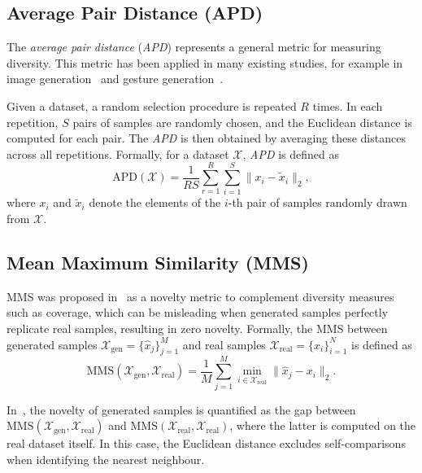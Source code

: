 \documentclass[journal]{IEEEtran}
\begin{document}
\subsection{Average Pair Distance (APD)}

The \textit{average pair distance} (\textit{APD}) represents a general metric for measuring diversity. This metric has been applied in many existing studies, for example in image generation~\cite{zhang_UnreasonableEffectivenessDeep_2018} and gesture generation~\cite{guo_Action2MotionConditionedGeneration_2020}.

Given a dataset, a random selection procedure is repeated $R$ times. In each repetition, $S$ pairs of samples are randomly chosen, and the Euclidean distance is computed for each pair. The \textit{APD} is then obtained by averaging these distances across all repetitions. Formally, for a dataset $\mathcal{X}$, \textit{APD} is defined as
\begin{equation}\label{eq:APD}
    \text{APD}(\mathcal{X}) = \frac{1}{R S} \sum_{r=1}^{R} \sum_{i=1}^{S} \| x_i - \tilde{x}_i \|_2,
\end{equation}
where $x_{i}$ and $\tilde{x}_{i}$ denote the elements of the $i$-th pair of samples randomly drawn from $\mathcal{X}$.

\subsection{Mean Maximum Similarity (MMS)}

MMS was proposed in~\cite{cervantes_ImplicitNeuralRepresentations_2022} as a novelty metric to complement diversity measures such as coverage, which can be misleading when generated samples perfectly replicate real samples, resulting in zero novelty. Formally, the MMS between generated samples $\mathcal{X}_{\text{gen}} = \{\hat{x}_j\}_{j=1}^{M}$ and real samples $\mathcal{X}_{\text{real}} = \{x_i\}_{i=1}^{N}$ is defined as
\begin{equation}
    \text{MMS}(\mathcal{X}_{\text{gen}}, \mathcal{X}_{\text{real}}) 
    = \frac{1}{M} \sum_{j=1}^{M} \min_{i \in \mathcal{X}_{\text{real}}} \| \hat{x}_j - x_i \|_2.
\end{equation}

In~\cite{cervantes_ImplicitNeuralRepresentations_2022}, the novelty of generated samples is quantified as the gap between 
$\text{MMS}(\mathcal{X}_{\text{gen}}, \mathcal{X}_{\text{real}})$ and 
$\text{MMS}(\mathcal{X}_{\text{real}}, \mathcal{X}_{\text{real}})$, where the latter is computed on the real dataset itself. In this case, the Euclidean distance excludes self-comparisons when identifying the nearest neighbour.
\end{document}

